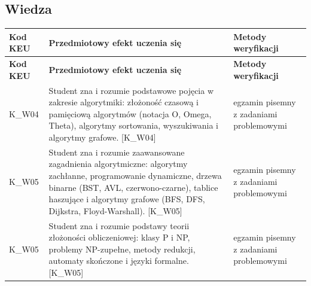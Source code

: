 \documentclass[12pt, a4paper]{article}
\newcommand{\thdrule}{\noalign{\global\setlength{\extrarowheight}{0pt}}}
\newcommand{\thdend}{\noalign{\global\setlength{\extrarowheight}{3pt}}}
\begin{document}
\subsection*{Wiedza}
{\scriptsize
\begin{longtable}{m{1.6cm}m{9.0cm}m{4.2cm}}
\thdrule\toprule
\rowcolor{pjatkRed} {\color{white}\footnotesize\textbf{\vphantom{Ag}Kod KEU}} & {\color{white}\footnotesize\textbf{\vphantom{Ag}Przedmiotowy efekt uczenia się}} & {\color{white}\footnotesize\textbf{\vphantom{Ag}Metody weryfikacji}} \\
\midrule\thdend
\endfirsthead
\thdrule\toprule
\rowcolor{pjatkRed} {\color{white}\footnotesize\textbf{\vphantom{Ag}Kod KEU}} & {\color{white}\footnotesize\textbf{\vphantom{Ag}Przedmiotowy efekt uczenia się}} & {\color{white}\footnotesize\textbf{\vphantom{Ag}Metody weryfikacji}} \\
\midrule\thdend
\endhead
  \rowcolor{tableRowLight} K\_W04 & Student zna i rozumie podstawowe pojęcia w zakresie algorytmiki: złożoność czasową i pamięciową algorytmów (notacja O, Omega, Theta), algorytmy sortowania, wyszukiwania i algorytmy grafowe. {[}K\_W04{]} & egzamin pisemny z zadaniami problemowymi \\
  \rowcolor{tableRowAlt} K\_W05 & Student zna i rozumie zaawansowane zagadnienia algorytmiczne: algorytmy zachłanne, programowanie dynamiczne, drzewa binarne (BST, AVL, czerwono-czarne), tablice haszujące i algorytmy grafowe (BFS, DFS, Dijkstra, Floyd-Warshall). {[}K\_W05{]} & egzamin pisemny z zadaniami problemowymi \\
  \rowcolor{tableRowLight} K\_W05 & Student zna i rozumie podstawy teorii złożoności obliczeniowej: klasy P i NP, problemy NP-zupełne, metody redukcji, automaty skończone i języki formalne. {[}K\_W05{]} & egzamin pisemny z zadaniami problemowymi \\
\bottomrule
\end{longtable}}
\end{document}
